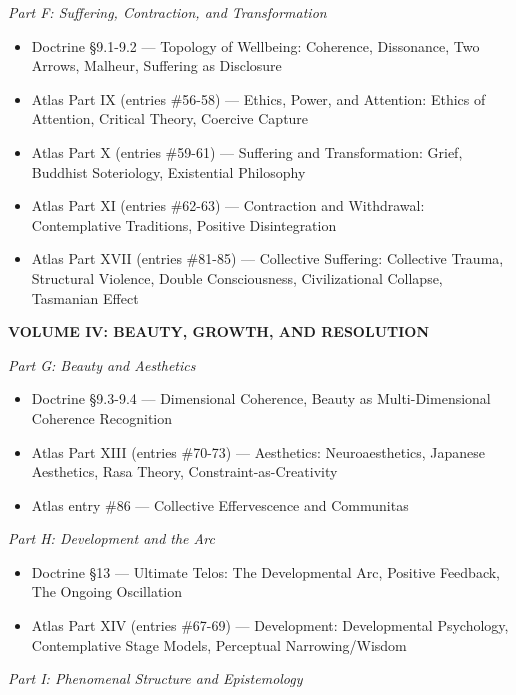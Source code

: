 \textit{Part F: Suffering, Contraction, and Transformation}

\begin{itemize}[nosep,leftmargin=*]
  \item Doctrine §9.1-9.2 — Topology of Wellbeing: Coherence, Dissonance, Two Arrows, Malheur, Suffering as Disclosure
  \item Atlas Part IX (entries \#56-58) — Ethics, Power, and Attention: Ethics of Attention, Critical Theory, Coercive Capture
  \item Atlas Part X (entries \#59-61) — Suffering and Transformation: Grief, Buddhist Soteriology, Existential Philosophy
  \item Atlas Part XI (entries \#62-63) — Contraction and Withdrawal: Contemplative Traditions, Positive Disintegration
  \item Atlas Part XVII (entries \#81-85) — Collective Suffering: Collective Trauma, Structural Violence, Double Consciousness, Civilizational Collapse, Tasmanian Effect
\end{itemize}


\bigskip\noindent\makebox[\textwidth]{\color{rulegray}\rule{5cm}{0.3pt}}\bigskip


\textbf{VOLUME IV: BEAUTY, GROWTH, AND RESOLUTION}


\textit{Part G: Beauty and Aesthetics}

\begin{itemize}[nosep,leftmargin=*]
  \item Doctrine §9.3-9.4 — Dimensional Coherence, Beauty as Multi-Dimensional Coherence Recognition
  \item Atlas Part XIII (entries \#70-73) — Aesthetics: Neuroaesthetics, Japanese Aesthetics, Rasa Theory, Constraint-as-Creativity
  \item Atlas entry \#86 — Collective Effervescence and Communitas
\end{itemize}


\textit{Part H: Development and the Arc}

\begin{itemize}[nosep,leftmargin=*]
  \item Doctrine §13 — Ultimate Telos: The Developmental Arc, Positive Feedback, The Ongoing Oscillation
  \item Atlas Part XIV (entries \#67-69) — Development: Developmental Psychology, Contemplative Stage Models, Perceptual Narrowing/Wisdom
\end{itemize}


\textit{Part I: Phenomenal Structure and Epistemology}

